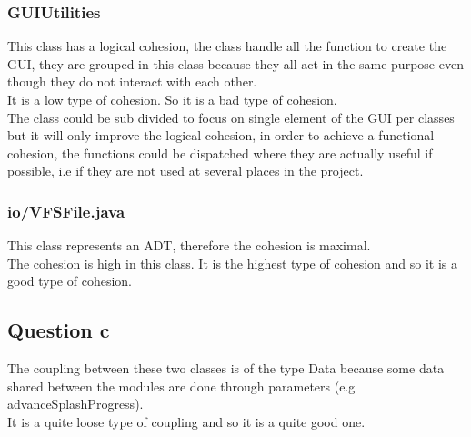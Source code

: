 \documentclass[a4paper,10pt]{article}
\begin{document}
\subsubsection{GUIUtilities}
This class has a logical cohesion, the class handle all the function to create the GUI, they are grouped in this class because they all act in the same purpose even though they do not interact with each other.\\
It is a low type of cohesion. So it is a bad type of cohesion.\\
The class could be sub divided to focus on single element of the GUI per classes but it will only improve the logical cohesion, in order to achieve a functional cohesion, the functions could be dispatched where they are actually useful if possible, i.e if they are not used at several places in the project.
\subsubsection{io/VFSFile.java}
This class represents an ADT, therefore the cohesion is maximal.\\
The cohesion is high in this class. It is the highest type of cohesion and so it is a good type of cohesion.
\subsection{Question c}
The coupling between these two classes is of the type Data because some data shared between the modules are done through parameters (e.g advanceSplashProgress).\\
It is a quite loose type of coupling and so it is a quite good one.
\end{document}
